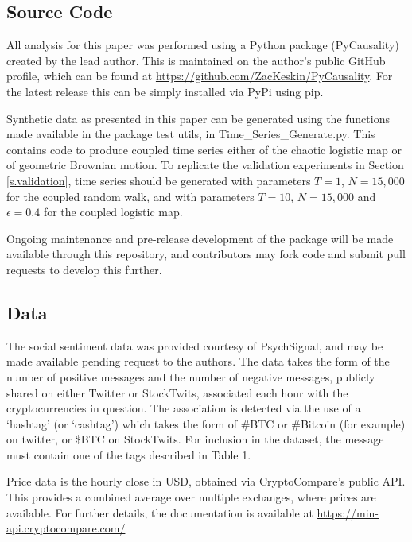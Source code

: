 \documentclass[]{rsos}%
\begin{document}
  \subsection{Source Code}
    All analysis for this paper was performed using a Python package (PyCausality) created by the lead author. This is maintained on the author's public GitHub profile, which can be found at \url{https://github.com/ZacKeskin/PyCausality}. For the latest release this can be simply installed via PyPi using pip. 

    Synthetic data as presented in this paper can be generated using the functions made available in the package test utils, in Time\_Series\_Generate.py. This contains code to produce coupled time series either of the chaotic logistic map or of geometric Brownian motion. To replicate the validation experiments in Section \ref{s.validation}, time series should be generated with parameters $T=1$, $N=15,000$ for the coupled random walk, and with parameters $T=10$, $N=15,000$ and $\epsilon=0.4$ for the coupled logistic map. 

    Ongoing maintenance and pre-release development of the package will be made available through this repository, and contributors may fork code and submit pull requests to develop this further.


  \subsection{Data} \label{a.data}

  The social sentiment data was provided courtesy of PsychSignal, and may be made available pending request to the authors. The data takes the form of the number of positive messages and the number of negative messages, publicly shared on either Twitter or StockTwits, associated each hour with the cryptocurrencies in question. The association is detected via the use of a `hashtag' (or `cashtag') which takes the form of \#BTC or \#Bitcoin (for example) on twitter, or \$BTC on StockTwits.  For inclusion in the dataset, the message must contain one of the tags described in Table {\color{blue}1}.  
  
  Price data is the hourly close in USD, obtained via CryptoCompare's public API. This provides a combined average over multiple exchanges, where prices are available. For further details, the documentation is available at \url{https://min-api.cryptocompare.com/}
\end{document}
